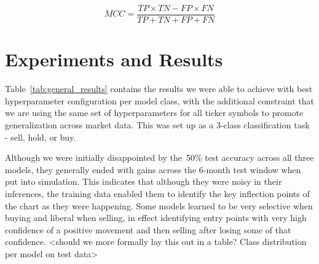 \documentclass[10pt,twocolumn,letterpaper]{article}
\begin{document}
\begin{equation} \label{eq:mcc}
    MCC = \frac{TP \times TN - FP \times FN}{TP + TN + FP + FN}
\end{equation}


\section{Experiments and Results}

Table~\ref{tab:general_results} contains the results we were able to achieve with best hyperparameter configuration per model class, with the additional constraint that we are using the same set of hyperparameters for all ticker symbols to promote generalization across market data. This was set up as a 3-class classification task - sell, hold, or buy.

\begin{table}
\begin{center}
\end{center}
\caption{Data splits and time frames.}
\label{tab:general_results}
\end{table}

Although we were initially disappointed by the~50\% test accuracy across all three models, they generally ended with gains across the 6-month test window when put into simulation. This indicates that although they were noisy in their inferences, the training data enabled them to identify the key inflection points of the chart as they were happening. Some models learned to be very selective when buying and liberal when selling, in effect identifying entry points with very high confidence of a positive movement and then selling after losing some of that confidence.  <should we more formally lay this out in a table? Class distribution per model on test data>
\end{document}
